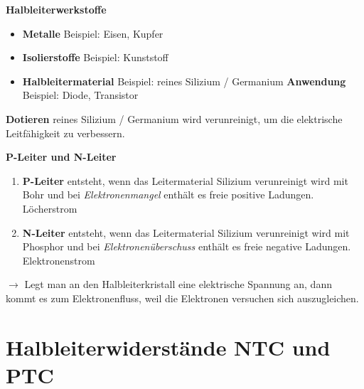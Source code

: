 \textbf{Halbleiterwerkstoffe}

\begin{itemize}
\item
  \textbf{Metalle} Beispiel: Eisen, Kupfer
\item
  \textbf{Isolierstoffe} Beispiel: Kunststoff
\item
  \textbf{Halbleitermaterial} Beispiel: reines Silizium / Germanium
  \textbf{Anwendung} Beispiel: Diode, Transistor
\end{itemize}

\textbf{Dotieren} reines Silizium / Germanium wird verunreinigt, um die
elektrische Leitfähigkeit zu verbessern.

\textbf{P-Leiter und N-Leiter}

\begin{enumerate}
\item
  \textbf{P-Leiter} entsteht, wenn das Leitermaterial Silizium
  verunreinigt wird mit Bohr und bei \emph{Elektronenmangel} enthält es
  freie positive Ladungen. Löcherstrom
\item
  \textbf{N-Leiter} entsteht, wenn das Leitermaterial Silizium
  verunreinigt wird mit Phosphor und bei \emph{Elektronenüberschuss}
  enthält es freie negative Ladungen. Elektronenstrom
\end{enumerate}

$\to$ Legt man an den Halbleiterkristall eine elektrische Spannung an,
dann kommt es zum Elektronenfluss, weil die Elektronen versuchen sich
auszugleichen.

\section{Halbleiterwiderstände NTC und
PTC}\label{halbleiterwiderstaende-ntc-und-ptc}

